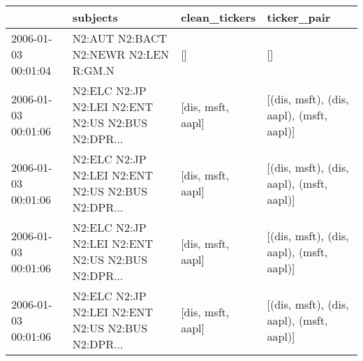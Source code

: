 \begin{tabular}{llll}
\toprule
{} &                                           subjects &      clean\_tickers &                               ticker\_pair \\
\midrule
2006-01-03 00:01:04 &               N2:AUT N2:BACT N2:NEWR N2:LEN R:GM.N &                 [] &                                        [] \\
2006-01-03 00:01:06 &  N2:ELC N2:JP N2:LEI N2:ENT N2:US N2:BUS N2:DPR... &  [dis, msft, aapl] &  [(dis, msft), (dis, aapl), (msft, aapl)] \\
2006-01-03 00:01:06 &  N2:ELC N2:JP N2:LEI N2:ENT N2:US N2:BUS N2:DPR... &  [dis, msft, aapl] &  [(dis, msft), (dis, aapl), (msft, aapl)] \\
2006-01-03 00:01:06 &  N2:ELC N2:JP N2:LEI N2:ENT N2:US N2:BUS N2:DPR... &  [dis, msft, aapl] &  [(dis, msft), (dis, aapl), (msft, aapl)] \\
2006-01-03 00:01:06 &  N2:ELC N2:JP N2:LEI N2:ENT N2:US N2:BUS N2:DPR... &  [dis, msft, aapl] &  [(dis, msft), (dis, aapl), (msft, aapl)] \\
\bottomrule
\end{tabular}

